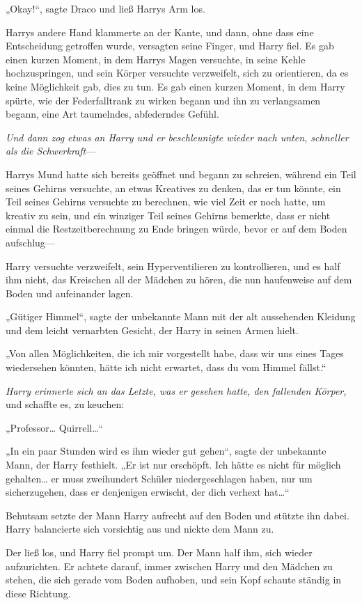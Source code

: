 {„Okay!“, sagte Draco und ließ Harrys Arm los.

Harrys andere Hand klammerte an der Kante, und dann, ohne dass eine Entscheidung getroffen wurde, versagten seine Finger, und Harry fiel. Es gab einen kurzen Moment, in dem Harrys Magen versuchte, in seine Kehle hochzuspringen, und sein Körper versuchte verzweifelt, sich zu orientieren, da es keine Möglichkeit gab, dies zu tun. Es gab einen kurzen Moment, in dem Harry spürte, wie der Federfalltrank zu wirken begann und ihn zu verlangsamen begann, eine Art taumelndes, abfederndes Gefühl.

\emph{Und dann zog etwas an Harry und er beschleunigte wieder nach unten, schneller als die Schwerkraft}—

Harrys Mund hatte sich bereits geöffnet und begann zu schreien, während ein Teil seines Gehirns versuchte, an etwas Kreatives zu denken, das er tun könnte, ein Teil seines Gehirns versuchte zu berechnen, wie viel Zeit er noch hatte, um kreativ zu sein, und ein winziger Teil seines Gehirns bemerkte, dass er nicht einmal die Restzeitberechnung zu Ende bringen würde, bevor er auf dem Boden aufschlug—

Harry versuchte verzweifelt, sein Hyperventilieren zu kontrollieren, und es half ihm nicht, das Kreischen all der Mädchen zu hören, die nun haufenweise auf dem Boden und aufeinander lagen.

„Gütiger Himmel“, sagte der unbekannte Mann mit der alt aussehenden Kleidung und dem leicht vernarbten Gesicht, der Harry in seinen Armen hielt.

„Von allen Möglichkeiten, die ich mir vorgestellt habe, dass wir uns eines Tages wiedersehen könnten, hätte ich nicht erwartet, dass du vom Himmel fällst.“

\emph{Harry erinnerte sich an das Letzte, was er gesehen hatte, den fallenden Körper,} und schaffte es, zu keuchen:

„Professor… Quirrell…“

„In ein paar Stunden wird es ihm wieder gut gehen“, sagte der unbekannte Mann, der Harry festhielt. „Er ist nur erschöpft. Ich hätte es nicht für möglich gehalten… er muss zweihundert Schüler niedergeschlagen haben, nur um sicherzugehen, dass er denjenigen erwischt, der dich verhext hat…“

Behutsam setzte der Mann Harry aufrecht auf den Boden und stützte ihn dabei. Harry balancierte sich vorsichtig aus und nickte dem Mann zu.

Der ließ los, und Harry fiel prompt um. Der Mann half ihm, sich wieder aufzurichten. Er achtete darauf, immer zwischen Harry und den Mädchen zu stehen, die sich gerade vom Boden aufhoben, und sein Kopf schaute ständig in diese Richtung.

}
